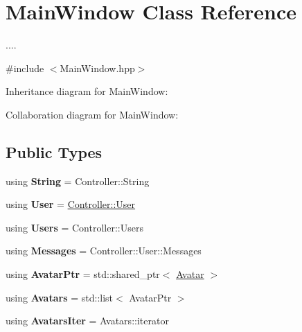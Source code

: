 \hypertarget{classMainWindow}{}\section{Main\+Window Class Reference}
\label{classMainWindow}


....  




{\ttfamily \#include $<$Main\+Window.\+hpp$>$}



Inheritance diagram for Main\+Window\+:


Collaboration diagram for Main\+Window\+:
\subsection*{Public Types}
\begin{DoxyCompactItemize}
\item 
using {\bfseries String} = Controller\+::\+String\hypertarget{classMainWindow_af416d8047630dd82f6cfa634bb915327}{}\label{classMainWindow_af416d8047630dd82f6cfa634bb915327}

\item 
using {\bfseries User} = \hyperlink{classClientUser}{Controller\+::\+User}\hypertarget{classMainWindow_aa7582c1e62b59932c1c6f68fa06eef75}{}\label{classMainWindow_aa7582c1e62b59932c1c6f68fa06eef75}

\item 
using {\bfseries Users} = Controller\+::\+Users\hypertarget{classMainWindow_ac314ed3adac0e81b970d173c80127916}{}\label{classMainWindow_ac314ed3adac0e81b970d173c80127916}

\item 
using {\bfseries Messages} = Controller\+::\+User\+::\+Messages\hypertarget{classMainWindow_acea644f5ab53aaf3641e1275e1bd4b2a}{}\label{classMainWindow_acea644f5ab53aaf3641e1275e1bd4b2a}

\item 
using {\bfseries Avatar\+Ptr} = std\+::shared\+\_\+ptr$<$ \hyperlink{classAvatar}{Avatar} $>$\hypertarget{classMainWindow_a1b9689e38b2fb2820a00db6a245b893f}{}\label{classMainWindow_a1b9689e38b2fb2820a00db6a245b893f}

\item 
using {\bfseries Avatars} = std\+::list$<$ Avatar\+Ptr $>$\hypertarget{classMainWindow_a19aa9ffd2cced790cb38f4cad7bc53cf}{}\label{classMainWindow_a19aa9ffd2cced790cb38f4cad7bc53cf}

\item 
using {\bfseries Avatars\+Iter} = Avatars\+::iterator\hypertarget{classMainWindow_a3608af39e78dc29962f4acb11209c653}{}\label{classMainWindow_a3608af39e78dc29962f4acb11209c653}

\end{DoxyCompactItemize}
